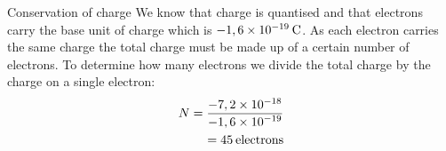 \begin{wex}{Conservation of charge}
{     We know that charge is quantised and that electrons carry the base unit of charge which is $-1,6\ensuremath{\times}{10}^{-19}\phantom{\rule{2pt}{0ex}}\text{C}$.
     As each electron carries the same charge the total charge must be made up of a certain number of electrons. To determine how many electrons we divide the total charge by the charge on a single electron:
    \begin{eqnarray*}
     N=\frac{-7,2\ensuremath{\times}{10}^{-18}}{-1,6\ensuremath{\times}{10}^{-19}}\\ \phantom{x}=45\phantom{\rule{2pt}{0ex}}\text{electrons} 
    \end{eqnarray*}
}\end{wex}




  \label{m38781*uid11}
